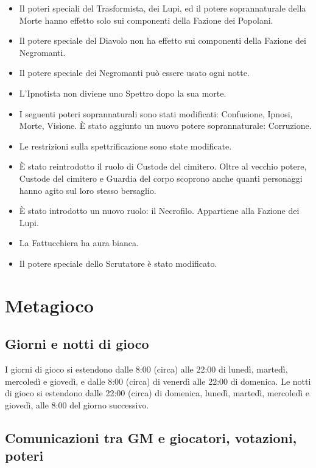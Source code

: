 \documentclass[a4paper,10pt]{article}
\begin{document}
 \begin{itemize}
 	\item Il poteri speciali del Trasformista, dei Lupi, ed il potere soprannaturale della Morte hanno effetto solo sui componenti della Fazione dei Popolani.
 	\item Il potere speciale del Diavolo non ha effetto sui componenti della Fazione dei Negromanti.
 	\item Il potere speciale dei Negromanti può essere usato ogni notte.
 	\item L'Ipnotista non diviene uno Spettro dopo la sua morte.
 	\item I seguenti poteri soprannaturali sono stati modificati: Confusione, Ipnosi, Morte, Visione. È stato aggiunto un nuovo potere soprannaturale: Corruzione.
 	\item Le restrizioni sulla spettrificazione sono state modificate.
 	\item È stato reintrodotto il ruolo di Custode del cimitero. Oltre al vecchio potere, Custode del cimitero e Guardia del corpo scoprono anche quanti personaggi hanno agito sul loro stesso bersaglio.
 	\item È stato introdotto un nuovo ruolo: il Necrofilo. Appartiene alla Fazione dei Lupi.
 	\item La Fattucchiera ha aura bianca.
 	\item Il potere speciale dello Scrutatore è stato modificato.
 \end{itemize}




\pagebreak
\section{Metagioco}

\subsection{Giorni e notti di gioco}

I giorni di gioco si estendono dalle 8:00 (circa) alle 22:00 di lunedì, martedì, mercoledì e giovedì, e dalle 8:00 (circa) di venerdì alle 22:00 di domenica. Le notti di gioco si estendono dalle 22:00 (circa) di domenica, lunedì, martedì, mercoledì e giovedì, alle 8:00 del giorno successivo.


\subsection{Comunicazioni tra GM e giocatori, votazioni, poteri}
\end{document}
